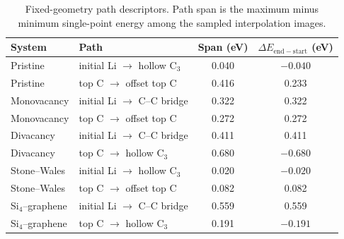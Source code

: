 \begin{table}[!htbp]
  \centering
  \small
  \caption{Fixed-geometry path descriptors. Path span is the maximum minus
  minimum single-point energy among the sampled interpolation images.}
  \label{tab:si_path_scans}
  \begin{tabular}{llcc}
    \toprule
    System & Path & Span (eV) & $\Delta E_{\mathrm{end-start}}$ (eV) \\
    \midrule
    Pristine & initial Li $\rightarrow$ hollow C$_3$ & 0.040 & $-0.040$ \\
    Pristine & top C $\rightarrow$ offset top C & 0.416 & 0.233 \\
    Monovacancy & initial Li $\rightarrow$ C--C bridge & 0.322 & 0.322 \\
    Monovacancy & top C $\rightarrow$ offset top C & 0.272 & 0.272 \\
    Divacancy & initial Li $\rightarrow$ C--C bridge & 0.411 & 0.411 \\
    Divacancy & top C $\rightarrow$ hollow C$_3$ & 0.680 & $-0.680$ \\
    Stone--Wales & initial Li $\rightarrow$ hollow C$_3$ & 0.020 & $-0.020$ \\
    Stone--Wales & top C $\rightarrow$ offset top C & 0.082 & 0.082 \\
    Si$_4$--graphene & initial Li $\rightarrow$ C--C bridge & 0.559 & 0.559 \\
    Si$_4$--graphene & top C $\rightarrow$ hollow C$_3$ & 0.191 & $-0.191$ \\
    \bottomrule
  \end{tabular}
\end{table}
